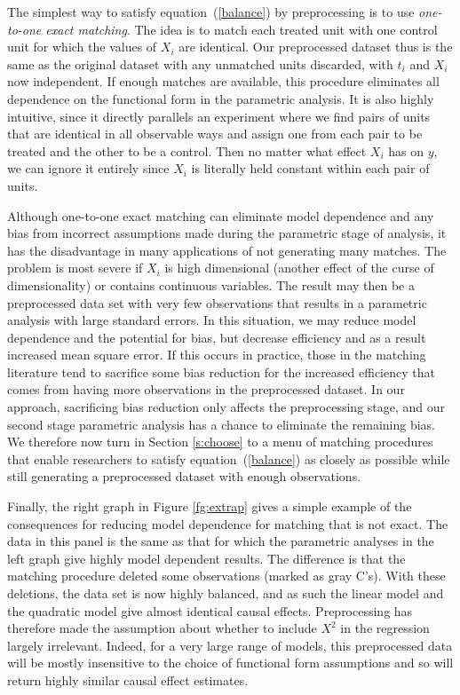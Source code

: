 \documentclass[11pt,titlepage]{article}
\begin{document}
The simplest way to satisfy equation~(\ref{balance}) by preprocessing
is to use \emph{one-to-one exact matching}.  The idea is to match each
treated unit with one control unit for which the values of $X_i$ are
identical.  Our preprocessed dataset thus is the same as the original
dataset with any unmatched units discarded, with $t_i$ and $X_i$ now
independent.  If enough matches are available, this procedure
eliminates all dependence on the functional form in the parametric
analysis.  It is also highly intuitive, since it directly parallels an
experiment where we find pairs of units that are identical in all
observable ways and assign one from each pair to be treated and the
other to be a control.  Then no matter what effect $X_i$ has on $y$,
we can ignore it entirely since $X_i$ is literally held constant
within each pair of units.

Although one-to-one exact matching can eliminate model dependence and
any bias from incorrect assumptions made during the parametric stage
of analysis, it has the disadvantage in many applications of not
generating many matches.  The problem is most severe if $X_i$ is high
dimensional (another effect of the curse of dimensionality) or
contains continuous variables.  The result may then be a preprocessed
data set with very few observations that results in a parametric
analysis with large standard errors.  In this situation, we may reduce
model dependence and the potential for bias, but decrease efficiency
and as a result increased mean square error.  If this occurs in
practice, those in the matching literature tend to sacrifice some bias
reduction for the increased efficiency that comes from having more
observations in the preprocessed dataset.  In our approach,
sacrificing bias reduction only affects the preprocessing stage, and
our second stage parametric analysis has a chance to eliminate the
remaining bias.  We therefore now turn in Section \ref{s:choose} to a
menu of matching procedures that enable researchers to satisfy
equation~(\ref{balance}) as closely as possible while still generating
a preprocessed dataset with enough observations.

Finally, the right graph in Figure \ref{fg:extrap} gives a simple
example of the consequences for reducing model dependence for matching
that is not exact.  The data in this panel is the same as that for
which the parametric analyses in the left graph give highly model
dependent results.  The difference is that the matching procedure
deleted some observations (marked as gray C's).  With these deletions,
the data set is now highly balanced, and as such the linear model and
the quadratic model give almost identical causal effects.
Preprocessing has therefore made the assumption about whether to
include $X^2$ in the regression largely irrelevant.  Indeed, for a
very large range of models, this preprocessed data will be mostly
insensitive to the choice of functional form assumptions and so will
return highly similar causal effect estimates.
\end{document}
